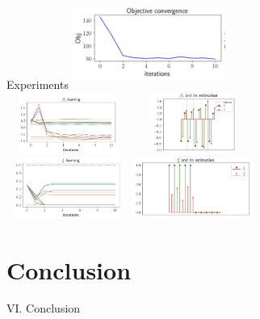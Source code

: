 \documentclass{beamer}
\begin{document}
\begin{frame}{Experiments}
  \centering
  \includegraphics[height= 3cm, width=5cm]{figures/likelihood.png} \hspace{1cm} \\
  \vspace{0.5cm}
  \includegraphics[height= 2cm, width=4cm]{figures/beta_learning.png} \hspace{0.7cm}
  \includegraphics[height= 2cm, width=4cm]{figures/beta_estimation.png} \\
  \vspace{0.5cm}
  \includegraphics[height= 2cm, width=4cm]{figures/xi_learning.png} \hspace{0.7cm}
  \includegraphics[height= 2cm, width=4cm]{figures/xi_estimation.png} \\
\end{frame}

\section{Conclusion}

\begin{frame}[noframenumbering]
\Large \centering
\textcolor{blue_pres}{VI.} Conclusion
\end{frame}
\end{document}
